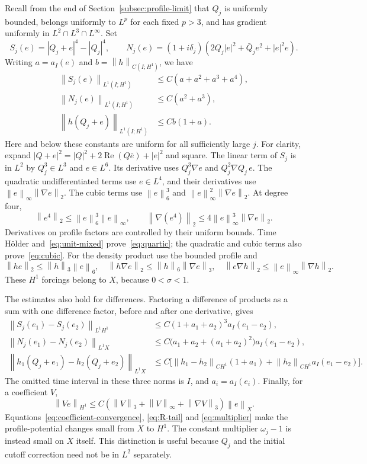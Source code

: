 \documentclass[11pt]{article}
\numberwithin{equation}{section}
\theoremstyle{remark}
\newcommand{\norm}[1]{\left\|#1\right\|}
\DeclareMathOperator{\Rea}{Re}
\begin{document}
Recall from the end of Section~\ref{subsec:profile-limit} that $Q_j$
is uniformly bounded, belongs uniformly to $L^p$ for each fixed $p>3$,
and has gradient uniformly in $L^2\cap L^3\cap L^\infty$. Set
\[
 S_j(e)=|Q_j+e|^4-|Q_j|^4,\qquad
 N_j(e)=(1+i\delta_j)(2Q_j|e|^2+\bar Q_je^2+|e|^2e).
\]
Writing $a=a_I(e)$ and $b=\norm h_{C(I;H^1)}$, we have
\begin{align}
 \norm{S_j(e)}_{L^1(I;H^1)}&\le C(a+a^2+a^3+a^4),\label{eq:quartic}\\
 \norm{N_j(e)}_{L^1(I;H^1)}&\le C(a^2+a^3),\label{eq:cubic}\\
 \norm{h(Q_j+e)}_{L^1(I;H^1)}&\le Cb(1+a).
 \label{eq:density-product}
\end{align}
Here and below these constants are uniform for all sufficiently large $j$.
For clarity, expand
$|Q+e|^2=|Q|^2+2\Rea(Q\bar e)+|e|^2$ and square.
The linear term of $S_j$ is in $L^2$ by $Q_j^3\in L^3$ and $e\in L^6$.
Its derivative uses $Q_j^3\nabla e$ and $Q_j^2\nabla Q_j\,e$.
The quadratic undifferentiated terms use $e\in L^4$, and their derivatives
use $\norm e_\infty\norm{\nabla e}_2$.
The cubic terms use $\norm e_6^3$ and
$\norm e_\infty^2\norm{\nabla e}_2$.
At degree four,
\[
 \norm{e^4}_2\le\norm e_6^3\norm e_\infty,
 \qquad
 \norm{\nabla(e^4)}_2\le4\norm e_\infty^3\norm{\nabla e}_2.
\]
Derivatives on profile factors are controlled by their uniform bounds.
Time H\"older and~\eqref{eq:unit-mixed} prove~\eqref{eq:quartic}; the
quadratic and cubic terms also prove~\eqref{eq:cubic}. For the density
product use the bounded profile and
\[
 \norm{he}_2\le\norm h_3\norm e_6,\quad
 \norm{h\nabla e}_2\le\norm h_6\norm{\nabla e}_3,\quad
 \norm{e\nabla h}_2\le\norm e_\infty\norm{\nabla h}_2.
\]
These $H^1$ forcings belong to $X$, because $0<\sigma<1$.

The estimates also hold for differences. Factoring a difference of
products as a sum with one difference factor, before and after one
derivative, gives
\begin{align}
 \norm{S_j(e_1)-S_j(e_2)}_{L^1H^1}
  &\le C(1+a_1+a_2)^3 a_I(e_1-e_2),\label{eq:quartic-difference}\\
 \norm{N_j(e_1)-N_j(e_2)}_{L^1X}
  &\le C\bigl(a_1+a_2+(a_1+a_2)^2\bigr)a_I(e_1-e_2),
  \label{eq:cubic-difference}\\
 \norm{h_1(Q_j+e_1)-h_2(Q_j+e_2)}_{L^1X}
  &\le C\bigl[\norm{h_1-h_2}_{CH^1}(1+a_1)
                  +\norm{h_2}_{CH^1}a_I(e_1-e_2)\bigr].
  \label{eq:density-difference}
\end{align}
The omitted time interval in these three norms is $I$, and $a_i=a_I(e_i)$.
Finally, for a coefficient $V$,
\begin{equation}\label{eq:multiplier}
 \norm{Ve}_{H^1}
 \le C(\norm V_3+\norm V_\infty+\norm{\nabla V}_3)\norm e_X.
\end{equation}
Equations~\eqref{eq:coefficient-convergence}, \eqref{eq:R-tail} and
\eqref{eq:multiplier} make the profile-potential changes small from $X$
to $H^1$. The constant multiplier $\omega_j-1$ is instead small on $X$
itself. This distinction is useful because $Q_j$ and the initial cutoff
correction need not be in $L^2$ separately.
\end{document}
